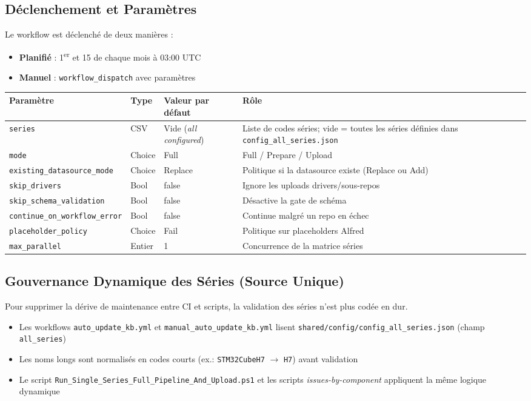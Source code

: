 \documentclass[12pt,a4paper]{report}
\begin{document}
\subsection{Déclenchement et Paramètres}

Le workflow est déclenché de deux manières :
\begin{itemize}
  \item \textbf{Planifié} : 1\textsuperscript{er} et 15 de chaque mois à 03:00 UTC
  \item \textbf{Manuel} : \texttt{workflow\_dispatch} avec paramètres
\end{itemize}

\begin{longtable}{p{4.2cm}p{2.2cm}p{2.5cm}p{4.1cm}}
\toprule
\textbf{Paramètre} & \textbf{Type} & \textbf{Valeur par défaut} & \textbf{Rôle} \\
\midrule
\texttt{series} & CSV & Vide (\textit{all configured}) & Liste de codes séries; vide = toutes les séries définies dans \texttt{config\_all\_series.json} \\
\texttt{mode} & Choice & Full & Full / Prepare / Upload \\
\texttt{existing\_datasource\_mode} & Choice & Replace & Politique si la datasource existe (Replace ou Add) \\
\texttt{skip\_drivers} & Bool & false & Ignore les uploads drivers/sous-repos \\
\texttt{skip\_schema\_validation} & Bool & false & Désactive la gate de schéma \\
\texttt{continue\_on\_workflow\_error} & Bool & false & Continue malgré un repo en échec \\
\texttt{placeholder\_policy} & Choice & Fail & Politique sur placeholders Alfred \\
\texttt{max\_parallel} & Entier & 1 & Concurrence de la matrice séries \\
\bottomrule
\end{longtable}

\subsection{Gouvernance Dynamique des Séries (Source Unique)}

Pour supprimer la dérive de maintenance entre CI et scripts, la validation des séries n'est plus codée en dur.

\begin{itemize}
  \item Les workflows \texttt{auto\_update\_kb.yml} et \texttt{manual\_auto\_update\_kb.yml} lisent \texttt{shared/config/config\_all\_series.json} (champ \texttt{all\_series})
  \item Les noms longs sont normalisés en codes courts (ex.: \texttt{STM32CubeH7} $\rightarrow$ \texttt{H7}) avant validation
  \item Le script \texttt{Run\_Single\_Series\_Full\_Pipeline\_And\_Upload.ps1} et les scripts \textit{issues-by-component} appliquent la même logique dynamique
\end{itemize}
\end{document}
